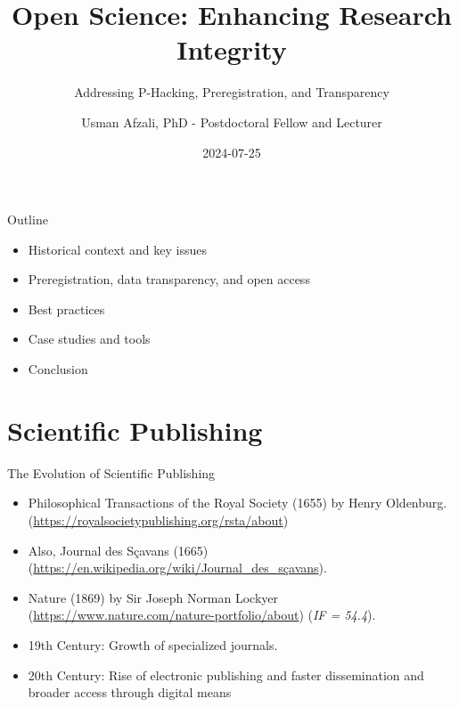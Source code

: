\documentclass[
  ignorenonframetext,
  aspectratio=169,
]{beamer}
\title{Open Science: Enhancing Research Integrity}
\subtitle{Addressing P-Hacking, Preregistration, and Transparency}
\author{Usman Afzali, PhD - Postdoctoral Fellow and Lecturer}
\date{2024-07-25}
\institute{University of Canterbury}
\providecommand{\tightlist}{%
  \setlength{\itemsep}{0pt}\setlength{\parskip}{0pt}}\usepackage{longtable,booktabs,array}
\begin{document}
\frame{\titlepage}

\begin{frame}{Outline}
\label{outline}
\begin{itemize}
\tightlist
\item
  Historical context and key issues
\item
  Preregistration, data transparency, and open access
\item
  Best practices
\item
  Case studies and tools
\item
  Conclusion
\end{itemize}
\end{frame}

\begin{frame}
\end{frame}

\section{Scientific Publishing}\label{scientific-publishing}

\begin{frame}{The Evolution of Scientific Publishing}
\label{the-evolution-of-scientific-publishing}
\begin{itemize}[<+->]
\tightlist
\item
  Philosophical Transactions of the Royal Society (1655) by Henry
  Oldenburg. (\url{https://royalsocietypublishing.org/rsta/about})
\item
  Also, Journal des Sçavans (1665)
  (\url{https://en.wikipedia.org/wiki/Journal_des_sçavans}).
\item
  Nature (1869) by Sir Joseph Norman Lockyer
  (\url{https://www.nature.com/nature-portfolio/about}) (\emph{IF =
  54.4}).
\item
  19th Century: Growth of specialized journals.
\item
  20th Century: Rise of electronic publishing and faster dissemination
  and broader access through digital means
\end{itemize}
\end{frame}
\end{document}
